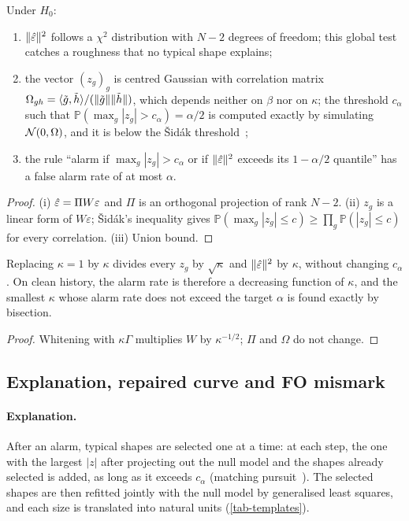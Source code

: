 \begin{proposition}\label{prop-family}
Under $H_0$:
\begin{enumerate}[label=(\roman*)]
\item $\lVert \hat\varepsilon\rVert^2$ follows a $\chi^2$ distribution with $N-2$ degrees of freedom; this global test catches a roughness
that no typical shape explains;
\item the vector $(z_g)_{g}$ is centred Gaussian with correlation matrix
$\Omega_{gh}=\langle \tilde g, \tilde h\rangle/(\lVert \tilde g\rVert\lVert \tilde h\rVert)$, which depends neither on $\beta$ nor on $\kappa$; the
threshold $c_\alpha$ such that $\mathbb P(\max_g|z_g|>c_\alpha)=\alpha/2$ is computed exactly by simulating
$\mathcal{N}(0, \Omega)$, and it is below the Šidák threshold~\cite{sidak1967};
\item the rule ``alarm if $\max_g|z_g|>c_\alpha$ or if $\lVert \hat\varepsilon\rVert^2$ exceeds its $1-\alpha/2$ quantile'' has a false
alarm rate of at most $\alpha$.
\end{enumerate}
\end{proposition}
\begin{proof}
(i) $\hat\varepsilon=\Pi W\varepsilon$ and $\Pi$ is an orthogonal projection of rank $N-2$. (ii) $z_g$ is a linear form of
$W\varepsilon$; Šidák's inequality gives $\mathbb P(\max_g|z_g|\le c)\ge\prod_g\mathbb P(|z_g|\le c)$ for every
correlation. (iii) Union bound.
\end{proof}

\begin{proposition}\label{prop-kappa}
Replacing $\kappa=1$ by $\kappa$ divides every $z_g$ by $\sqrt\kappa$ and $\lVert \hat\varepsilon\rVert^2$ by $\kappa$, without changing
$c_\alpha$. On clean history, the alarm rate is therefore a decreasing function of $\kappa$, and the smallest $\kappa$
whose alarm rate does not exceed the target $\alpha$ is found exactly by bisection.
\end{proposition}
\begin{proof}
Whitening with $\kappa\Gamma$ multiplies $W$ by $\kappa^{-1/2}$; $\Pi$ and $\Omega$ do not change.
\end{proof}

\subsection{Explanation, repaired curve and FO mismark}\label{sec-attribution}
\paragraph{Explanation.} After an alarm, typical shapes are selected one at a time: at each step, the one with the
largest $|z|$ after projecting out the null model and the shapes already selected is added, as long as it exceeds
$c_\alpha$ (matching pursuit~\cite{mallat1993}). The selected shapes are then refitted jointly with the null model by
generalised least squares, and each size is translated into natural units (\cref{tab-templates}).

